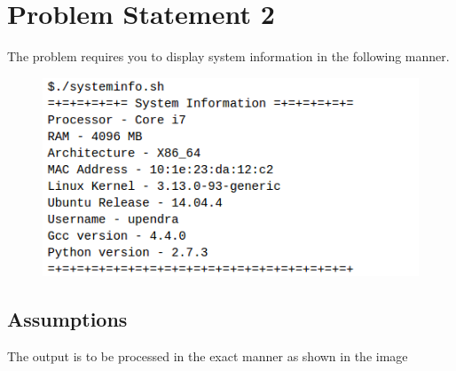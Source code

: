 \documentclass[11pt]{report}
\begin{document}
\section{Problem Statement 2}
	The problem requires you to display system information in the following manner. \\
	\begin{figure}[h!]
	\centering
	\includegraphics[scale=0.7]{images/Selection_001}	
	\end{figure}
	\subsection{Assumptions}
	The output is to be processed in the exact manner as shown in the image
	\pagebreak
\end{document}
